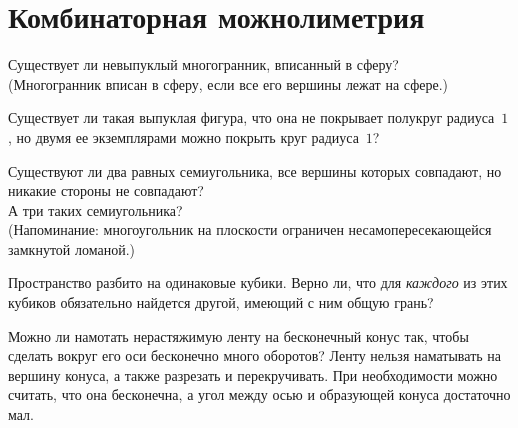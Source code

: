 
\section*{Комбинаторная можнолиметрия}


\begin{problems}


\item
Существует ли невыпуклый многогранник, вписанный в сферу?
\\
(Многогранник вписан в сферу, если все его вершины лежат на сфере.)

\item
Существует ли такая выпуклая фигура, что она не покрывает полукруг радиуса~$1$,
но двумя ее экземплярами можно покрыть круг радиуса~$1$?

\item
\sp
Существуют ли два равных семиугольника, все вершины которых совпадают,
но никакие стороны не совпадают?
\\
\sp
А три таких семиугольника?
\\
(Напоминание: многоугольник на плоскости ограничен несамопересекающейся
замкнутой ломаной.)

\item
Пространство разбито на одинаковые кубики.
Верно ли, что для \emph{каждого} из этих кубиков обязательно найдется другой,
имеющий с ним общую грань?

\item
Можно ли намотать нерастяжимую ленту на бесконечный конус так, чтобы сделать
вокруг его оси бесконечно много оборотов?
Ленту нельзя наматывать на вершину конуса, а также разрезать и перекручивать.
При необходимости можно считать, что она бесконечна, а угол между осью
и образующей конуса достаточно мал.


\end{problems}
